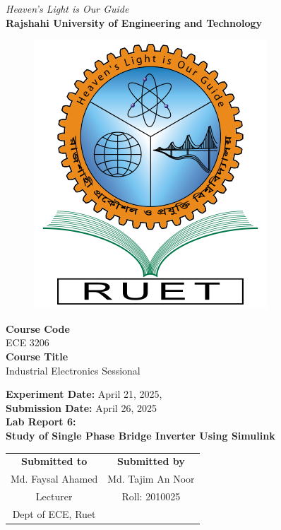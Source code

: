 \vspace*{\fill}
\begin{center}

    \emph{Heaven's Light is Our Guide} \\
    \textbf{Rajshahi University of Engineering and Technology} \\

    \begin{figure}[H]
        \centering
        \includegraphics[scale=.34]{images/RUET_logo.png}
        \label{fig:ruet_logo}
    \end{figure}
    \vspace{5mm}

    \textbf{Course Code}\\
    ECE 3206\\
    \vspace{3mm}
    \textbf{Course Title}\\
    Industrial Electronics Sessional

    \vspace{5mm}
    \textbf{Experiment Date:} {April 21, 2025},\\
    \textbf{Submission Date:} {April 26, 2025}\\

    \vspace{5mm}
    \textbf{Lab Report 6: \\
        Study of Single Phase Bridge Inverter Using Simulink}

    \vspace{15mm}

    \begin{tabular}{c|c}
        \textbf{Submitted to} & \textbf{Submitted by} \\
        Md. Faysal Ahamed     & Md. Tajim An Noor     \\
        Lecturer              & Roll: 2010025         \\
        Dept of ECE, Ruet     &                       \\
    \end{tabular}

\end{center}
\vspace*{\fill}
